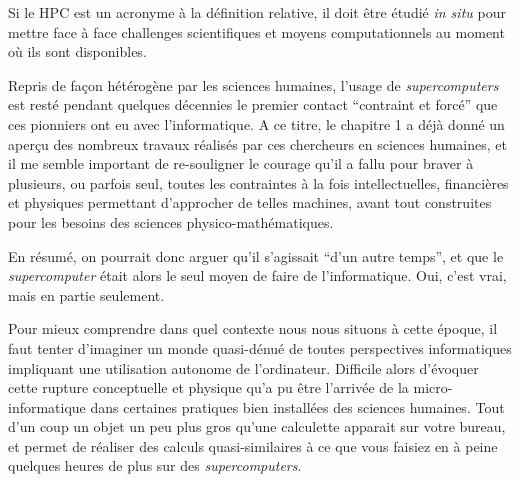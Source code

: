 



Si le HPC est un acronyme à la définition relative, il doit être étudié \textit{in situ} pour mettre face à face challenges scientifiques et moyens computationnels au moment où ils sont disponibles.



Repris de façon hétérogène par les sciences humaines, l’usage de \textit{supercomputers} est resté pendant quelques décennies le premier contact \enquote{contraint et forcé} que ces pionniers ont eu avec l'informatique. A ce titre, le chapitre 1 a déjà donné un aperçu des nombreux travaux réalisés par ces chercheurs en sciences humaines, et il me semble important de re-souligner le courage qu'il a fallu pour braver à plusieurs, ou parfois seul, toutes les contraintes à la fois intellectuelles, financières et physiques permettant d'approcher de telles machines, avant tout construites pour les besoins des sciences physico-mathématiques.

En résumé, on pourrait donc arguer qu'il s'agissait \enquote{d'un autre temps}, et que le \textit{supercomputer} était alors le seul moyen de faire de l'informatique. Oui, c'est vrai, mais en partie seulement.

Pour mieux comprendre dans quel contexte nous nous situons à cette époque, il faut tenter d'imaginer un monde quasi-dénué de toutes perspectives informatiques impliquant une utilisation autonome de l'ordinateur. Difficile alors d'évoquer cette rupture conceptuelle et physique qu'a pu être l'arrivée de la micro-informatique dans certaines pratiques bien installées des sciences humaines. Tout d'un coup un objet un peu plus gros qu'une calculette apparait sur votre bureau, et permet de réaliser des calculs quasi-similaires à ce que vous faisiez en à peine quelques heures de plus sur des \textit{supercomputers}.

